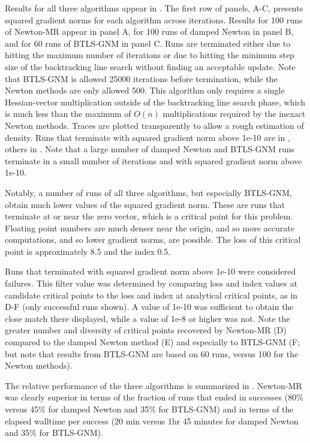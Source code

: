 \documentclass[../../thesis.tex]{subfiles}
\begin{document}
Results for all three algorithms appear in .
The first row of panels, A-C,
presents squared gradient norms for each algorithm
across iterations.
Results for 100 runs of Newton-MR appear in panel A,
for 100 runs of damped Newton in panel B,
and for 60 runs of BTLS-GNM in panel C.
Runs are terminated either due to hitting the maximum number of iterations
or due to hitting the minimum step size of the backtracking line search
without finding an acceptable update.
Note that BTLS-GNM is allowed 25000 iterations before termination,
while the Newton methods are only allowed 500.
This algorithm only requires a single Hessian-vector multiplication
outside of the backtracking line search phase,
which is much less than the maximum of $O(n)$
multiplications required by the inexact Newton methods.
Traces are plotted transparently to allow a rough estimation of density.
Runs that terminate with squared gradient norm above 1e-10
are in \failcolor{},
others in \successcolor{}.
Note that a large number of damped Newton and BTLS-GNM runs
terminate in a small number of iterations
and with squared gradient norm above 1e-10.

Notably, a number of runs of all three algorithms,
but especially BTLS-GNM,
obtain much lower values of the squared gradient norm.
These are runs that terminate at or near the zero vector,
which is a critical point for this problem.
Floating point numbers are much denser near the origin,
and so more accurate computations,
and so lower gradient norms, are possible.
The loss of this critical point is approximately 8.5
and the index 0.5.

Runs that terminated with squared gradient norm above 1e-10 were considered failures.
This filter value was determined by comparing loss and index values
at candidate critical points to the loss and index at analytical critical points,
as in D-F (only successful runs shown).
A value of 1e-10 was sufficient to obtain the close match there displayed,
while a value of 1e-8 or higher was not.
Note the greater number and diversity of critical points recovered by Newton-MR
(D)
compared to the damped Newton method
(E)
and especially to BTLS-GNM
(F;\@
but note that results from BTLS-GNM
are based on 60 runs, versus 100 for the Newton methods).

The relative performance of the three algorithms
is summarized in .
Newton-MR was clearly superior in terms of the fraction of runs
that ended in successes
(80\% versus 45\% for damped Newton and 35\% for BTLS-GNM)
and in terms of the elapsed walltime per success
(20 min versus 1hr 45 minutes for damped Newton and 35\% for BTLS-GNM).
\end{document}

